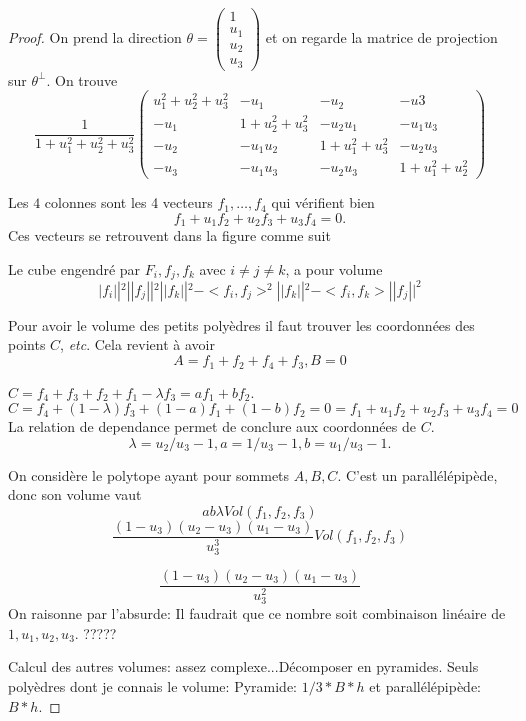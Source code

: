 \documentclass[10pt,a4paper]{amsart}
\begin{document}
\begin{proof}

On prend la direction $\theta=\begin{pmatrix}1\\u_1\\ u_2\\u_3\end{pmatrix}$ et on regarde la matrice de projection sur $\theta^\perp$. 
On trouve
$$\frac{1}{1+u_1^2+u_2^2+u_3^2}\begin{pmatrix} u_1^2+u_2^2+u_3^2&-u_1&-u_2&-u3\\
-u_1&1+u_2^2+u_3^2&-u_2u_1&-u_1u_3\\
-u_2&-u_1u_2&1+u_1^2+u_3^2&-u_2u_3\\
-u_3&-u_1u_3&-u_2u_3&1+u_1^2+u_2^2
\end{pmatrix}$$

Les $4$ colonnes sont les 4 vecteurs $f_1,\dots,f_4$ qui vérifient bien $$f_1+u_1f_2+u_2f_3+u_3f_4=0.$$ Ces vecteurs se retrouvent dans la figure comme suit
Le cube engendré par $F_i, f_j, f_k$ avec $i\neq j\neq k$, a pour volume 
$$|f_i||^2||f_j||^2||f_k||^2-<f_i,f_j>^2||f_k||^2-<f_i,f_k>||f_j||^2$$

 
Pour avoir le volume des petits polyèdres il faut trouver les coordonnées des points $C$, {\it etc}. 
Cela revient à avoir
$$A=f_1+f_2+f_4+f_3, B=0$$

$C=f_4+f_3+f_2+f_1-\lambda f_3=af_1+bf_2$. 
$$C=f_4+(1-\lambda) f_3+(1-a)f_1+(1-b)f_2=0=f_1+u_1f_2+u_2f_3+u_3f_4=0$$
La relation de dependance permet de conclure aux coordonnées de $C$.
$$\lambda=u_2/u_3-1, a=1/u_3-1, b=u_1/u_3-1.$$

On considère le polytope ayant pour sommets $A, B, C$. C'est un parallélépipède, donc son volume vaut 
$$ab\lambda Vol(f_1,f_2,f_3)$$ 
$$\frac{(1-u_3)(u_2-u_3)(u_1-u_3)}{u_3^3}Vol(f_1,f_2,f_3)$$ 

$$\frac{(1-u_3)(u_2-u_3)(u_1-u_3)}{u_3^2}$$ 
 \maltese\maltese On raisonne par l'absurde: Il faudrait que ce nombre soit combinaison linéaire de $1,u_1,u_2, u_3$.
 ?????
 
 \maltese\maltese
 

Calcul des autres volumes: assez complexe...Décomposer en pyramides. Seuls polyèdres dont je connais le volume:
Pyramide: $1/3*B*h$ et parallélépipède: $B*h$.

\end{proof} 
\end{document}
